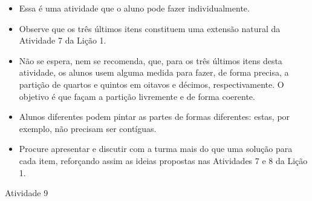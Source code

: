 \begin{multicols}{2}
  \vspace{.1cm}

  \vspace{.1cm}

\begin{itemize} %
    \item       Essa é uma atividade que o aluno pode fazer individualmente.
    \item       Observe que os três últimos itens constituem uma extensão natural da Atividade 7 da Lição 1.
    \item       Não se espera, nem se recomenda, que, para os três últimos itens desta atividade, os alunos usem alguma medida para fazer, de forma precisa, a partição de quartos e quintos em oitavos e décimos, respectivamente. O objetivo é que façam a partição livremente e de forma coerente.
    \item       Alunos diferentes podem pintar as partes de formas diferentes: estas, por exemplo, não precisam ser contíguas.
    \item       Procure apresentar e discutir com a turma mais do que uma solução para cada item, reforçando assim as ideias propostas nas Atividades 7 e 8 da Lição 1.
\end{itemize} %


  \vspace{.1cm}



\begin{resposta*}{Atividade 9}


\end{resposta*}
\end{multicols}
